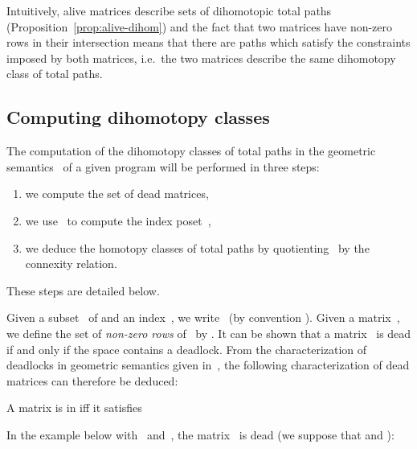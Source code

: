 \documentclass[orivec]{llncs} \usepackage[T1]{fontenc}
\newcommand{\comment}[1]{}
\newcommand{\ie}{i.e.~}
\begin{document}
Intuitively, alive matrices describe sets of dihomotopic total paths
(Proposition~\ref{prop:alive-dihom}) and the fact that two matrices have
non-zero rows in their intersection means that there are paths which satisfy
the constraints imposed by both matrices, \ie the two matrices describe the same
dihomotopy class of total paths.


\subsection{Computing dihomotopy classes}
\label{sec:homotopy-classes}
\label{algo}
The computation of the dihomotopy classes of total paths in the geometric
semantics~ of a given program will be performed in three steps:
\begin{enumerate}
\item we compute the set  of dead matrices,
\item we use~ to compute the index poset~,
\item we deduce the homotopy classes of total paths by quotienting~ by
  the connexity relation.
\end{enumerate}
These steps are detailed below.







Given a subset~ of  and an index~, we
write~ (by convention
\hbox{}). Given a matrix~, we define the
set of \emph{non-zero rows} of~ by \hbox{}. It can be shown that a matrix~ is dead if
and only if the space  contains a deadlock. From the characterization of
deadlocks in geometric semantics given in~\cite{fajstrup1998detecting}, the
following characterization of dead matrices can therefore be deduced:






\begin{proposition}
  A matrix  is in  iff it satisfies
  
\end{proposition}

\begin{example}
  In the example below with~ and~, the matrix~ is dead (we suppose that  and ):
  
\end{example}

\comment{
\begin{example}
  \label{exdead1}
  Consider the geometric semantics of the second program of
  Example~\ref{ex:geom-rel}. The minimal dead matrices are
  
\end{example}
}
\end{document}
